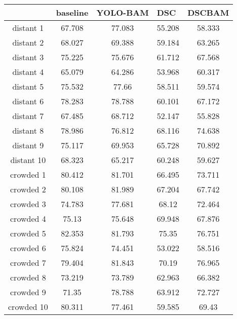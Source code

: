 \centering
\begin{tabular}{ccccc}
          & \multicolumn{1}{l}{baseline} & \multicolumn{1}{l}{YOLO-BAM} & \multicolumn{1}{l}{DSC}        & \multicolumn{1}{l}{DSCBAM} \\ \hline
distant 1  & 67.708 & 77.083 & 55.208 & 58.333 \\ \hline
distant 2 & 68.027  & 69.388 & 59.184 & 63.265 \\ \hline
distant 3  & 75.225 & 75.676 & 61.712 & 67.568 \\ \hline
distant 4  & 65.079 & 64.286 & 53.968 & 60.317 \\ \hline
distant 5  & 75.532 & 77.66  & 58.511 & 59.574 \\ \hline
distant 6  & 78.283 & 78.788 & 60.101 & 67.172 \\ \hline
distant 7  & 67.485 & 68.712 & 52.147 & 55.828 \\ \hline
distant 8  & 78.986 & 76.812 & 68.116 & 74.638 \\ \hline
distant 9  & 75.117 & 69.953 & 65.728 & 70.892 \\ \hline
distant 10 & 68.323 & 65.217 & 60.248 & 59.627 \\ \hline
crowded 1  & 80.412 & 81.701 & 66.495 & 73.711 \\ \hline
crowded 2  & 80.108 & 81.989 & 67.204 & 67.742 \\ \hline
crowded 3  & 74.783 & 77.681 & 68.12  & 72.464 \\ \hline
crowded 4  & 75.13  & 75.648 & 69.948 & 67.876 \\ \hline
crowded 5  & 82.353 & 81.793 & 75.35  & 76.751 \\ \hline
crowded 6  & 75.824 & 74.451 & 53.022 & 58.516 \\ \hline
crowded 7  & 79.404 & 81.843 & 70.19  & 76.965 \\ \hline
crowded 8  & 73.219 & 73.789 & 62.963 & 66.382 \\ \hline
crowded 9  & 71.35  & 78.788 & 63.912 & 72.727 \\ \hline
crowded 10 & 80.311 & 77.461 & 59.585 & 69.43  \\ \hline
\end{tabular}

\centering
{}


